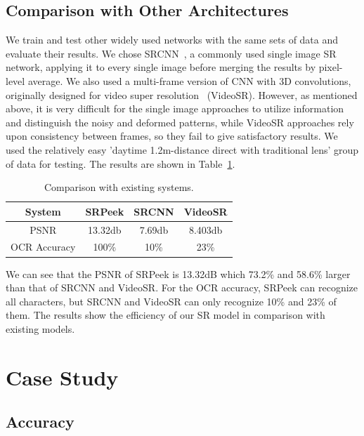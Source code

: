 \subsection{Comparison with Other Architectures}
We train and test other widely used networks with the same sets of data and evaluate their results. We chose SRCNN~\cite{dong2015image}, a commonly used single image SR network, applying it to every single image before merging the results by pixel-level average. We also used a multi-frame version of CNN with 3D convolutions, originally designed for video super resolution~\cite{kappeler2016video} (VideoSR). However, as mentioned above, it is very difficult for the single image approaches to utilize information and distinguish the noisy and deformed patterns, while VideoSR approaches rely upon consistency between frames, so they fail to give satisfactory results. We used the relatively easy 'daytime 1.2m-distance direct with traditional lens' group of data for testing. The results are shown in Table~\ref{table-comp}.
\begin{table}[!t]
    \centering
    \caption{Comparison with existing systems.}
    \begin{tabular}{@{}cccc@{}}
        \toprule
    System & SRPeek & SRCNN & VideoSR \\ \midrule
    PSNR & 13.32db & 7.69db & 8.403db\\ 
    OCR Accuracy & 100\% & 10\% & 23\%\\ \bottomrule
    \end{tabular}
    \label{table-comp}
\end{table}

We can see that the PSNR of SRPeek is 13.32dB which 73.2\% and 58.6\% larger than that of SRCNN and VideoSR. For the OCR accuracy, SRPeek can recognize all characters, but SRCNN and VideoSR can only recognize 10\% and 23\% of them. The results show the efficiency of our SR model in comparison with existing models.

\section{Case Study}
\label{case-study}
\subsection{Accuracy}

